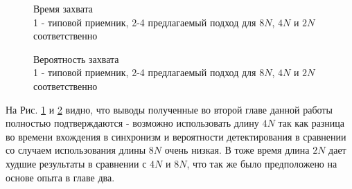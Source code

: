 \begin{figure}[h]
\center{}
	\caption{Время захвата\\ 1 - типовой приемник, 2-4 предлагаемый подход для ${8N}$, ${4N}$ и ${2N}$ соответственно}
	\label{pic:dma5mhz_lockTime}
\end{figure}

\begin{figure}[h]
\center{}
	\caption{Вероятность захвата\\ 1 - типовой приемник, 2-4 предлагаемый подход для ${8N}$, ${4N}$ и ${2N}$ соответственно}
	\label{pic:dma5mhz_probDetection}
\end{figure}

На Рис. \ref{pic:dma5mhz_lockTime} и \ref{pic:dma5mhz_probDetection} видно, что выводы полученные во второй главе данной работы полностью подтверждаются - возможно использовать
длину ${4N}$ так как разница во времени вхождения в синхронизм и вероятности детектирования в сравнении со случаем использования длины ${8N}$ очень низкая. В тоже время
длина ${2N}$ дает худшие результаты в сравнении с ${4N}$ и ${8N}$, что так же было предположено на основе опыта в главе два.


